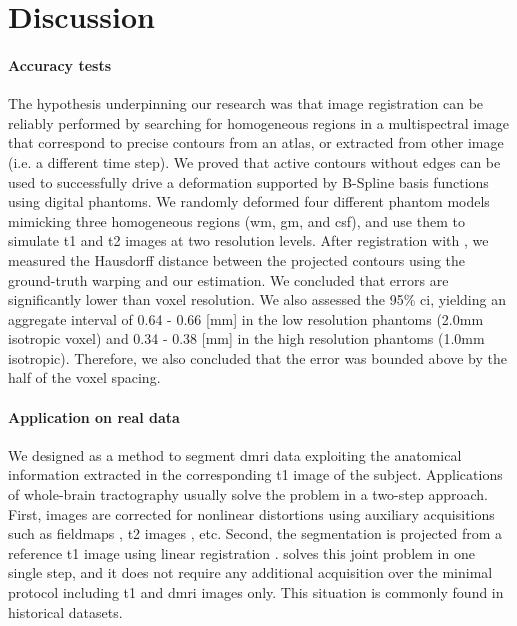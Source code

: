 \section{Discussion}
\label{sec:discussion}

\paragraph*{Accuracy tests}
The hypothesis underpinning our research was that image registration can be reliably performed
  by searching for homogeneous regions in a multispectral image that correspond to precise contours
  from an atlas, or extracted from other image (i.e. a different time step).
We proved that active contours without edges can be used to successfully drive a
  deformation supported by B-Spline basis functions using digital phantoms.
We randomly deformed four different phantom models mimicking three homogeneous regions
  (\gls*{wm}, \gls*{gm}, and \acrlong*{csf}), and use them to simulate \gls*{t1} and \gls*{t2}
  images at two resolution levels.
After registration with \regseg{}, we measured the Hausdorff distance between the
  projected contours using the ground-truth warping and our estimation.
We concluded that errors are significantly lower than voxel resolution.
We also assessed the 95\% \gls*{ci}, yielding an aggregate interval of
  0.64 - 0.66 [mm] in the low resolution phantoms (2.0mm isotropic voxel) and
  0.34 - 0.38 [mm] in the high resolution phantoms (1.0mm isotropic).
Therefore, we also concluded that the error was bounded above by the half of the
  voxel spacing.

\paragraph*{Application on real data}
We designed \regseg{} as a method to segment \gls*{dmri} data exploiting the
  anatomical information extracted in the corresponding \gls*{t1} image of the subject.
Applications of whole-brain tractography \citep{smith_tractbased_2006,craddock_imaging_2013}
  usually solve the problem in a two-step approach.
First, images are corrected for nonlinear distortions using auxiliary acquisitions
  such as fieldmaps \citep{jezzard_correction_1995}, \gls*{t2} images \citep{kybic_unwarping_2000},
  etc.
Second, the segmentation is projected from a reference \gls*{t1} image using linear
  registration \citep{greve_accurate_2009}.
\Regseg{} solves this joint problem in one single step, and it does not require any additional
  acquisition over the minimal protocol including \gls*{t1} and \gls*{dmri} images only.
This situation is commonly found in historical datasets.

